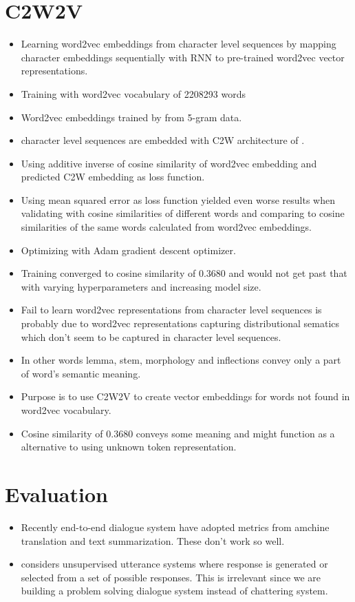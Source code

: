 \documentclass[12pt,a4paper,english
]{tutthesis}
\begin{document}
\section{C2W2V}
\begin{itemize}
\item Learning word2vec embeddings from character level sequences by mapping character embeddings sequentially with RNN to pre-trained word2vec vector representations.
\item Training with word2vec vocabulary of 2208293 words
\item Word2vec embeddings trained by \cite{Ginter2014} from 5-gram data.
\item character level sequences are embedded with C2W architecture of \cite{Ling2015}.
\item Using additive inverse of cosine similarity of word2vec embedding and predicted C2W embedding as loss function.
\item Using mean squared error as loss function yielded even worse results when validating with cosine similarities of different words and comparing to cosine similarities of the same words calculated from word2vec embeddings.
\item Optimizing with Adam gradient descent optimizer.
\item Training converged to cosine similarity of 0.3680 and would not get past that with varying hyperparameters and increasing model size.
\item Fail to learn word2vec representations from character level sequences is probably due to word2vec representations capturing distributional sematics which don't seem to be captured in character level sequences.
\item In other words lemma, stem, morphology and inflections convey only a part of word's semantic meaning.
\item Purpose is to use C2W2V to create vector embeddings for words not found in word2vec vocabulary.
\item Cosine similarity of 0.3680 conveys some meaning and might function as a alternative to using unknown token representation.
\end{itemize}

\section{Evaluation}
\label{se:evaluation}
\begin{itemize}
\item Recently end-to-end dialogue system have adopted metrics from amchine translation and text summarization. These don't work so well. \cite{Liu2016}
\item \cite{Liu2016} considers unsupervised utterance systems where response is generated or selected from a set of possible responses. This is irrelevant since we are building a problem solving dialogue system instead of chattering system.
\end{itemize}
\end{document}
